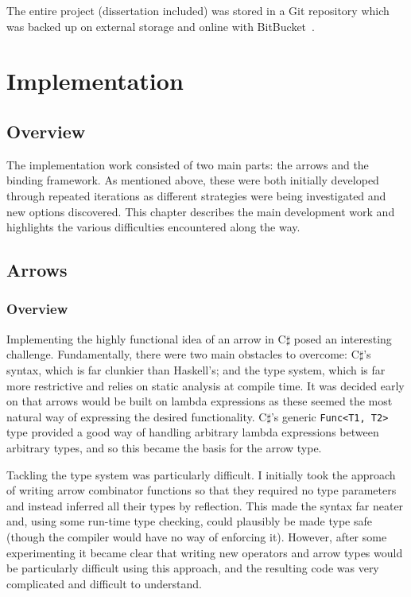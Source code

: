 \documentclass[12pt,twoside,notitlepage]{report}
\begin{document}
The entire project (dissertation included) was stored in a Git repository which was backed up on external storage and online with BitBucket~\cite{bitbucket}.

\cleardoublepage



\chapter{Implementation}

\section{Overview}

The implementation work consisted of two main parts: the arrows and the binding framework. As mentioned above, these were both initially developed through repeated iterations as different strategies were being investigated and new options discovered. This chapter describes the main development work and highlights the various difficulties encountered along the way.


\section{Arrows}

\subsection{Overview} \label{sec:arrows_overview}

Implementing the highly functional idea of an arrow in C$\sharp$ posed an interesting challenge. Fundamentally, there were two main obstacles to overcome: C$\sharp$'s syntax, which is far clunkier than Haskell's; and the type system, which is far more restrictive and relies on static analysis at compile time. It was decided early on that arrows would be built on lambda expressions as these seemed the most natural way of expressing the desired functionality. C$\sharp$'s generic \texttt{Func<T1, T2>} type provided a good way of handling arbitrary lambda expressions between arbitrary types, and so this became the basis for the arrow type.

Tackling the type system was particularly difficult. I initially took the approach of writing arrow combinator functions so that they required no type parameters and instead inferred all their types by reflection. This made the syntax far neater and, using some run-time type checking, could plausibly be made type safe (though the compiler would have no way of enforcing it). However, after some experimenting it became clear that writing new operators and arrow types would be particularly difficult using this approach, and the resulting code was very complicated and difficult to understand.
\end{document}
